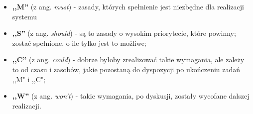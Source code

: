 \documentclass[11pt,oneside,a4paper,titlepage,onecolumn]{article}
\begin{document}
\begin{itemize}
	\item \textbf{,,M''} (z ang. \textit{must}) - zasady, których spełnienie jest niezbędne dla realizacji systemu
	\item \textbf{,,S''} (z ang. \textit{should}) - są to zasady o wysokim priorytecie, które powinny;
	zostać spełnione, o ile tylko jest to możliwe;
	\item \textbf{,,C''} (z ang. \textit{could}) - dobrze byłoby zrealizować takie wymagania, ale zależy to od czasu
	i zasobów, jakie pozostaną do dyspozycji po ukończeniu zadań ,,M" i ,,C";
	\item \textbf{,,W''} (z ang. \textit{won't}) - takie wymagania, po dyskusji, zostały wycofane dalszej realizacji.
\end{itemize}
\end{document}
